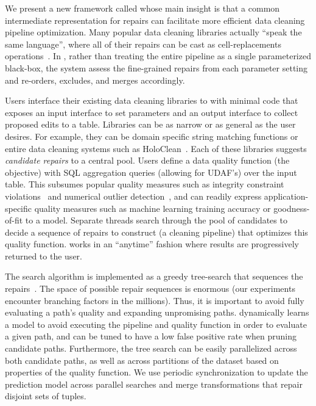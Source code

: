 We present a new framework called \sys whose main insight is that a common intermediate representation for repairs can facilitate more efficient data cleaning pipeline optimization.
Many popular data cleaning libraries actually ``speak the same language'', where all of their repairs can be cast as cell-replacements operations~\cite{rekatsinas2017holoclean,DBLP:conf/sigmod/ChuIKW16, DBLP:journals/pvldb/KrishnanWWFG16}.
In \sys, rather than treating the entire pipeline as a single parameterized black-box, the system assess the fine-grained repairs from each parameter setting and re-orders, excludes, and merges accordingly.

Users interface their existing data cleaning libraries to \sys with minimal code that exposes an input interface to set parameters and an output interface to collect proposed edits to a table.
Libraries can be as narrow or as general as the user desires.
For example, they can be domain specific string matching functions or entire data cleaning systems such as HoloClean~\cite{rekatsinas2017holoclean}.
Each of these libraries suggests \emph{candidate repairs} to a central pool.
Users define a data quality function (the objective) with SQL aggregation queries (allowing for UDAF's) over the input table.  This subsumes popular quality measures such as integrity constraint violations~\cite{ilyas2015trends} and numerical outlier detection~\cite{bailis2017macrobase}, and can readily express application-specific quality measures such as machine learning training accuracy or goodness-of-fit to a model. 
Separate threads search through the pool of candidates to decide a sequence of repairs to construct (a cleaning pipeline) that optimizes this quality function.
\sys works in an ``anytime'' fashion where results are progressively returned to the user.

The search algorithm is implemented as a greedy tree-search that sequences the repairs~\cite{russell2016artificial}.
The space of possible repair sequences is enormous (our experiments encounter branching factors in the millions).
Thus, it is important to avoid fully evaluating a path's quality and expanding unpromising paths.    
\sys dynamically learns a model to avoid executing the pipeline and quality function in order to evaluate a given path, and can be tuned to have a low false positive rate when pruning candidate paths.  
Furthermore, the tree search can be easily parallelized across both candidate paths, as well as across partitions of the dataset based on properties of the quality function.
We use periodic synchronization to update the prediction model across parallel searches and merge transformations that repair disjoint sets of tuples. 

